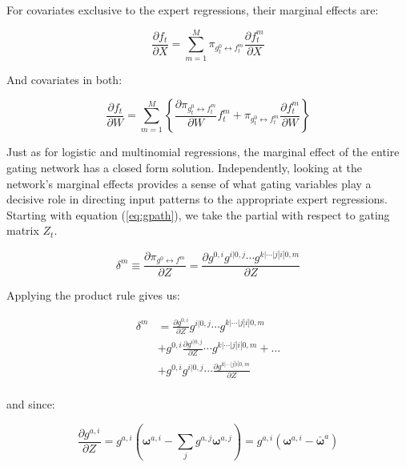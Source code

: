 \documentclass[12pt]{article}
\newcommand{\mean}[1]{\bar{#1}}
\newcommand{\gateprod}[2]{\pi_{#1 \longleftrightarrow #2}}
\begin{document}
For covariates exclusive to the expert regressions, their marginal effects
are:

\begin{equation} \label{eq:ME_expert}
  \frac{\partial f_{t}}{\partial X} = \sum_{m=1}^{M} \gateprod{g^{0}_{t}}{f^{m}_{t}} \frac{\partial f^{m}_{t}}{{\partial X}}
\end{equation}

And covariates in both:

\begin{equation} \label{eq:ME_both}
  \frac{\partial f_{t}}{\partial W} = \sum_{m=1}^{M} \left\{ \frac{\partial \gateprod{g^{0}_{t}}{f^{m}_{t}}}{{\partial W}}f^{m}_{t} + \gateprod{g^{0}_{t}}{f^{m}_{t}} \frac{\partial f^{m}_{t}}{{\partial W}} \right\}
\end{equation}

Just as for logistic and multinomial regressions, the
marginal effect of the entire gating network has a closed form solution.
Independently, looking at the network's marginal effects provides a sense
of what gating variables play a decisive role in directing input patterns
to the appropriate expert regressions. Starting with equation
(\ref{eq:gpath}), we take the partial with respect to gating matrix $Z_{t}$.

\begin{equation}
  \delta^{m} \equiv \frac{\partial \gateprod{g^{0}}{f^{m}}}{\partial Z} = \frac{\partial g^{0, i} g^{i|0, j} \cdots g^{k|\cdots|j|i|0, m}}{\partial Z}
\end{equation}

Applying the product rule gives us:

\begin{equation} \label{eq:hme_gate_marginal_effect}
  \begin{split}
    \delta^{m} &= \frac{\partial g^{0, i}}{\partial Z} g^{i|0, j} \cdots g^{k|\cdots|j|i|0, m} \\
                                     &+ g^{0, i} \frac{\partial g^{i|0, j}}{\partial Z} \cdots g^{k|\cdots|j|i|0, m} + \dots \\
                                     &+ g^{0, i} g^{i|0, j} \cdots \frac{\partial g^{k|\cdots|j|i|0, m}}{\partial Z} \\
  \end{split}
\end{equation}

and since:

\begin{equation} \label{eq:gate_marginal_effect}
  \frac{\partial g^{a, i}}{\partial Z} = g^{a, i} \left( \boldsymbol{\omega}^{a, i} - \sum_{j} g^{a, j} \boldsymbol{\omega}^{a, j} \right) = g^{a, i} \left( \boldsymbol{\omega}^{a, i} - \mean{\boldsymbol{\omega}}^{a} \right)
\end{equation}
\end{document}
